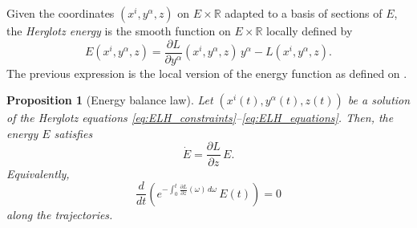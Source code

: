 \documentclass[11pt,a4paper]{article}
\newtheorem{proposition}[theorem]{Proposition}
\theoremstyle{definition}
\begin{document}
Given the coordinates $(x^{i},y^{\alpha},z)$ on $E\times\mathbb{R}$ adapted to a basis of sections of $E$, the \emph{Herglotz energy} is the smooth function on $E\times\mathbb{R}$ locally defined by
\begin{equation}\label{eq:energy_def}
E(x^{i},y^{\alpha},z) = \frac{\partial L}{\partial y^\alpha}(x^{i},y^{\alpha},z)\,y^\alpha - L(x^{i},y^{\alpha},z).
\end{equation}
The previous expression is the local version of the energy function as defined on \cite{anahory2024euler,anahory2025contact}.

\begin{proposition}[Energy balance law]
\label{prop:energy_balance}
Let $(x^{i}(t),y^{\alpha}(t),z(t))$ be a solution of the Herglotz equations
\eqref{eq:ELH_constraints}--\eqref{eq:ELH_equations}.  
Then, the energy $E$ satisfies
\begin{equation}\label{eq:energy_balance}
\dot E = \frac{\partial L}{\partial z}\,E.
\end{equation}
Equivalently,
\[
\frac{d}{dt}\left(
e^{-\int_0^t \frac{\partial L}{\partial z}(\omega)\,d\omega}\,E(t)
\right)=0
\]
along the trajectories.
\end{proposition}
\end{document}
